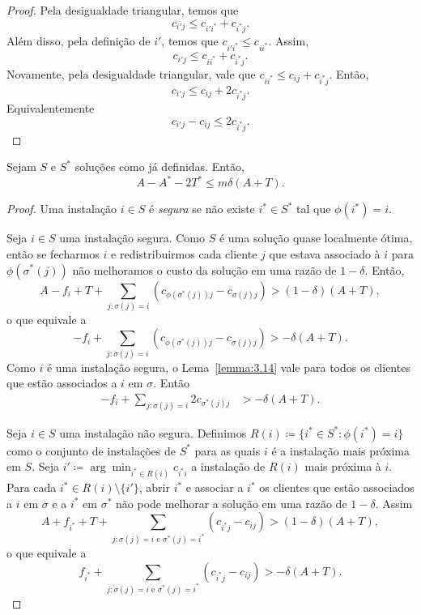\begin{proof}
    Pela desigualdade triangular, temos que
    \[c_{i'j} \leq c_{i'i^*} + c_{i^*j}.\] Além disso, pela definição de $i'$, temos que $c_{i'i^*} \leq c_{ii^*}$. Assim,
    \[c_{i'j} \leq c_{ii^*} + c_{i^*j}.\]
    Novamente, pela desigualdade triangular, vale que $c_{ii^*} \leq c_{ij} + c_{i^*j}$. Então,
    \[
        c_{i'j} \leq c_{ij} + 2 c_{i^*j}.
    \] Equivalentemente \[
        c_{i'j} - c_{ij} \leq 2 c_{i^*j}. \]
\end{proof}

\begin{lemma}
    \label{lemma:3.15}
    Sejam $S$ e $S^*$ soluções como já definidas. Então,
    \[A - A^* - 2T^* \leq m \delta(A+T).\]
\end{lemma}

\begin{proof}
    Uma instalação $i \in S$ é \emph{segura} se não existe $i^* \in S^*$ tal que $\phi(i^*)=i$.

    Seja $i \in S$ uma instalação segura. Como $S$ é uma solução quase localmente ótima, então se fecharmos $i$ e redistribuirmos cada cliente $j$ que estava associado à $i$ para $\phi(\sigma^*(j))$  não melhoramos o custo da solução em uma razão de $1-\delta$. Então,
    \[
        A - f_i + T + \sum_{j:\sigma(j) = i} (c_{\phi(\sigma^*(j))j} - c_{\sigma(j)j}) > (1-\delta)(A+T),\]
        o que equivale a 
        \[
        - f_i + \sum_{j:\sigma(j) = i} (c_{\phi(\sigma^*(j))j} - c_{\sigma(j)j}) > -\delta(A+T).
        \]
    Como $i$ é uma instalação segura, o Lema~\ref{lemma:3.14} vale para todos os clientes que estão associados a $i$ em $\sigma$. Então
    \begin{align} 
        \label{segura}
        - f_i + \sum_{j:\sigma(j) = i} 2c_{\sigma^*(j)j} &> -\delta(A+T).
    \end{align}

    Seja $i\in S$ uma instalação não segura. Definimos $R(i)\coloneqq \{i^* \in S^* : \phi(i^*) = i\}$ como o conjunto de instalações de $S^*$ para as quais $i$ é a instalação mais próxima em $S$. Seja $i' \coloneqq \arg\min_{i^* \in R(i)} c_{i^*i}$ a instalação de $R(i)$ mais próxima à $i$.
    Para cada $i^* \in R(i)\setminus\{i'\}$, abrir $i^*$ e associar a $i^*$ os clientes que estão associados a $i$ em $\sigma $ e a $i^*$ em $\sigma^*$ não pode melhorar a solução em uma razão de $1-\delta$. Assim
    \[
        A + f_{i^*} + T + \sum_{j: \sigma(j) = i \text{ e } \sigma^*(j) = i^*}(c_{i^*j} - c_{ij}) > (1-\delta)(A+T),\]
    o que equivale a 
        \begin{equation}
        \label{não segura}
        f_{i^*} + \sum_{j: \sigma(j) = i \text{ e } \sigma^*(j) = i^*}(c_{i^*j} - c_{ij}) > -\delta(A+T).        
    \end{equation}    


\end{proof}
